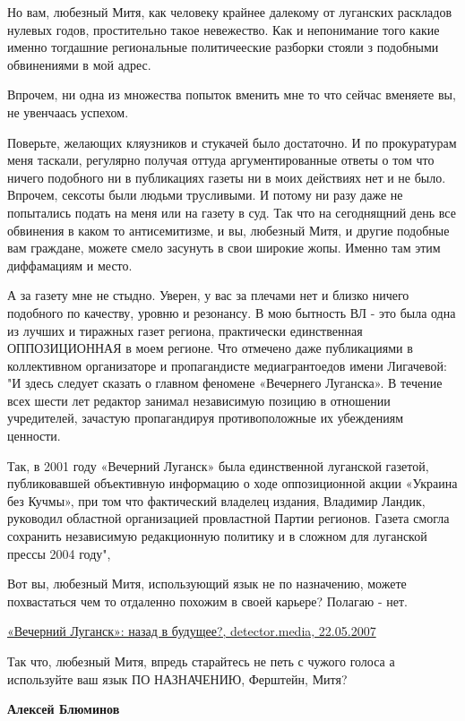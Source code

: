 \begin{itemize}
\begin{itemize}
Но вам, любезный Митя, как человеку крайнее далекому от луганских раскладов
нулевых годов, простительно такое невежество. Как и непонимание того какие
именно тогдашние региональные политичееские разборки стояли з подобными
обвинениями в мой адрес. 

Впрочем, ни одна из множества попыток вменить мне то что сейчас вменяете вы, не
увенчаась успехом. 

Поверьте, желающих кляузников и стукачей было достаточно. И по прокуратурам
меня таскали, регулярно получая оттуда аргументированные ответы о том что
ничего подобного ни в публикациях газеты ни в моих действиях нет и не было.
Впрочем, сексоты были людьми трусливыми. И потому ни разу даже не попытались
подать на меня или на газету в суд. Так что на сегоднящний день все обвинения в
каком то антисемитизме, и вы, любезный Митя, и другие подобные вам граждане,
можете смело засунуть в свои широкие жопы. Именно там этим диффамациям и место. 

А за газету мне не стыдно. Уверен, у
вас за плечами нет и близко ничего подобного по качеству, уровню и резонансу. В
мою бытность ВЛ - это была одна из лучших и тиражных газет региона, практически
единственная ОППОЗИЦИОННАЯ в моем регионе. Что отмечено даже публикациями в
коллективном организаторе и пропагандисте медиагрантоедов имени Лигачевой: "И
здесь следует сказать о главном феномене «Вечернего Луганска». В течение всех
шести лет редактор занимал независимую позицию в отношении учредителей,
зачастую пропагандируя противоположные их убеждениям ценности.

Так, в 2001 году «Вечерний Луганск» была единственной луганской газетой,
публиковавшей объективную информацию о ходе оппозиционной акции «Украина без
Кучмы», при том что фактический владелец издания, Владимир Ландик, руководил
областной организацией провластной Партии регионов. Газета смогла сохранить
независимую редакционную политику и в сложном для луганской прессы 2004 году", 

Вот вы, любезный Митя, использующий язык не по назначению, можете похвастаться
чем то отдаленно похожим в своей карьере? Полагаю - нет. 

\href{https://detector.media/rinok/article/8915/2007-05-22-vechernyy-lugansk-nazad-v-budushchee}{%
«Вечерний Луганск»: назад в будущее?, detector.media, 22.05.2007%
}

Так что, любезный Митя, впредь старайтесь не петь с чужого голоса а используйте
ваш язык ПО НАЗНАЧЕНИЮ, Ферштейн, Митя?

\textbf{Алексей Блюминов} 


\end{itemize}
\end{itemize}
